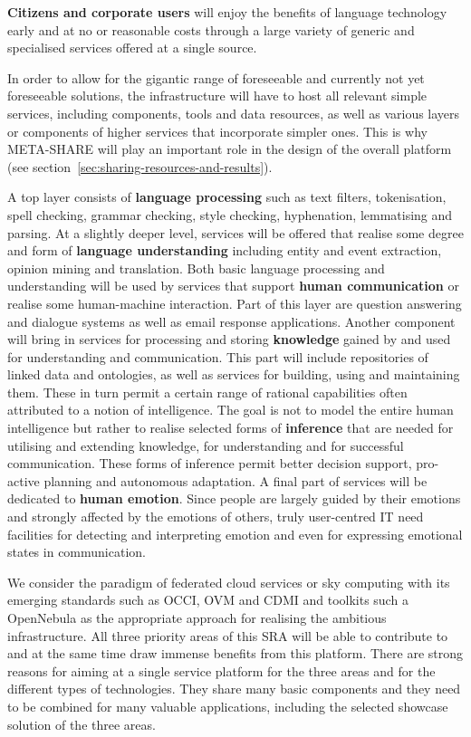 \documentclass[10pt, plain]{../../metanetpaper}
\begin{document}
\begin{multicols}{2}
\textbf{Citizens and corporate users} will enjoy the benefits of language technology early and at no or reasonable costs through a large variety of generic and specialised services offered at a single source.

In order to allow for the gigantic range of foreseeable and currently not yet foreseeable solutions, the infrastructure will have to host all relevant simple services, including components, tools and data resources, as well as various layers or components of higher services that incorporate simpler ones. This is why META-SHARE will play an important role in the design of the overall platform (see section~\ref{sec:sharing-resources-and-results}).
 
A top layer consists of \textbf{language processing} such as text filters, tokenisation, spell checking, grammar checking, style checking, hyphenation, lemmatising and parsing. At a slightly deeper level, services will be offered that realise some degree and form of \textbf{language understanding} including entity and event extraction, opinion mining and translation. Both basic language processing and understanding will be used by services that support \textbf{human communication} or realise some human-machine interaction. Part of this layer are question answering and dialogue systems as well as email response applications. Another component will bring in services for processing and storing \textbf{knowledge} gained by and used for understanding and communication. This part will include repositories of linked data and ontologies, as well as services for building, using and maintaining them. These in turn permit a certain range of rational capabilities often attributed to a notion of intelligence. The goal is not to model the entire human intelligence but rather to realise selected forms of \textbf{inference} that are needed for utilising and extending knowledge, for understanding and for successful communication. These forms of inference permit better decision support, pro-active planning and autonomous adaptation. A final part of services will be dedicated to \textbf{human emotion}. Since people are largely guided by their emotions and strongly affected by the emotions of others, truly user-centred IT need facilities for detecting and interpreting emotion and even for expressing emotional states in communication. 

We consider the paradigm of federated cloud services or sky computing with its emerging standards such as OCCI, OVM and CDMI and toolkits such a OpenNebula as the appropriate approach for realising the ambitious infrastructure. All three priority areas of this SRA will be able to contribute to and at the same time draw immense benefits from this platform. There are strong reasons for aiming at a single service platform for the three areas and for the different types of technologies. They share many basic components and they need to be combined for many valuable applications, including the selected showcase solution of the three areas.


\end{multicols}
\end{document}
